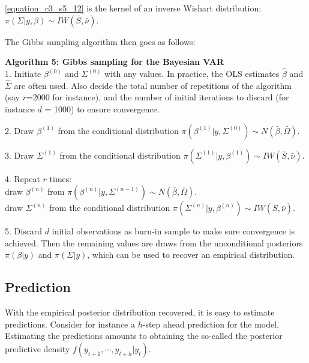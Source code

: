 \ref{equation_c3_s5_12} is the kernel of an inverse Wishart distribution: $\pi(\Sigma| y, \beta) \sim IW(\bar{S}, \bar{\nu})$.

The Gibbs sampling algorithm then goes as follows:

\textbf{Algorithm 5: Gibbs sampling for the Bayesian VAR} \vspace{3mm} \\
1. Initiate $\beta^{(0)}$ and $\Sigma^{(0)}$ with any values. In practice, the OLS estimates $\hat{\beta}$ and $\hat{\Sigma}$ are often used. Also decide the total number of repetitions of the algorithm (say $r$=2000 for instance), and the number of initial iterations to discard (for instance $d$ = 1000) to ensure convergence.

2. Draw $\beta^{(1)}$ from the conditional distribution $\pi(\beta^{(1)}| y, \Sigma^{(0)}) \sim N(\bar{\beta}, \bar{\Omega})$.

3. Draw $\Sigma^{(1)}$ from the conditional distribution $\pi(\Sigma^{(1)}| y, \beta^{(1)}) \sim IW(\bar{S}, \bar{\nu})$.

4. Repeat $r$ times: \\
draw $\beta^{(n)}$ from $\pi(\beta^{(n)}| y, \Sigma^{(n-1)}) \sim N(\bar{\beta}, \bar{\Omega})$. \\
draw $\Sigma^{(n)}$ from the conditional distribution $\pi(\Sigma^{(n)}| y, \beta^{(n)}) \sim IW(\bar{S}, \bar{\nu})$.

5. Discard $d$ initial observations as burn-in sample to make sure convergence is achieved. Then the remaining values are draws from the unconditional posteriors $\pi(\beta| y)$ and $\pi(\Sigma| y)$, which can be used to recover an empirical distribution.


\subsection{Prediction}
\label{chapter3_section5_subsection3}


With the empirical posterior distribution recovered, it is easy to estimate predictions. Consider for instance a $h$-step ahead prediction for the model. Estimating the predictions amounts to obtaining the so-called the posterior predictive density $f(y_{t+1}, \cdots, y_{t+h}| y_t)$. 

\newpage

